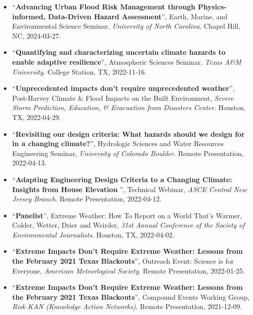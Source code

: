 \documentclass[10pt,oneside]{article}
\begin{document}
\begin{itemize}[label={}]
  
  \item \enquote{\textbf{Advancing Urban Flood Risk Management through Physics-informed, Data-Driven Hazard Assessment}}, Earth, Marine, and Environmental Science Seminar,  \textit{University of North Carolina}. Chapel Hill, NC, 2024-03-27.
  
  \item \enquote{\textbf{Quantifying and characterizing uncertain climate hazards to enable adaptive resilience}}, Atmospheric Sciences Seminar,  \textit{Texas A\&M University}. College Station, TX, 2022-11-16.
  
  \item \enquote{\textbf{Unprecedented impacts don't require unprecedented weather}}, Post-Harvey Climate \& Flood Impacts on the Built Environment,  \textit{Severe Storm Prediction, Education, \& Evacuation from Disasters Center}. Houston, TX, 2022-04-29.
  
  \item \enquote{\textbf{Revisiting our design criteria: What hazards should we design for in a changing climate?}}, Hydrologic Sciences and Water Resources Engineering Seminar,  \textit{University of Colorado Boulder}. Remote Presentation, 2022-04-13.
  
  \item \enquote{\textbf{Adapting Engineering Design Criteria to a Changing Climate: Insights from House Elevation }}, Technical Webinar,  \textit{ASCE Central New Jersey Branch}. Remote Presentation, 2022-04-12.
  
  \item \enquote{\textbf{Panelist}}, Extreme Weather: How To Report on a World That's Warmer, Colder, Wetter, Drier and Weirder,  \textit{31st Annual Conference of the Society of Environmental Journalists}. Houston, TX, 2022-04-02.
  
  \item \enquote{\textbf{Extreme Impacts Don't Require Extreme Weather: Lessons from the February 2021 Texas Blackouts}}, Outreach Event: Science is for Everyone,  \textit{American Meteorlogical Society}. Remote Presentation, 2022-01-25.
  
  \item \enquote{\textbf{Extreme Impacts Don't Require Extreme Weather: Lessons from the February 2021 Texas Blackouts}}, Compound Events Working Group,  \textit{Risk KAN (Knowledge Action Networks)}. Remote Presentation, 2021-12-09.
  

\end{itemize}
\end{document}
